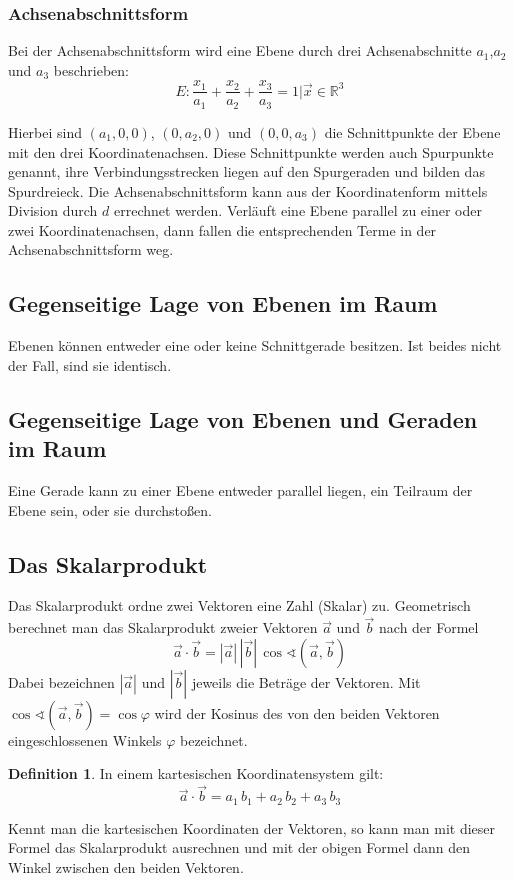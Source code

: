 \documentclass[a4paper,10pt,DIV9, BCOR12mm, oneside,openright,openbib]{scrreprt}
\theoremstyle{definition}
\newtheorem{mydef}{Definition}[section]
\theoremstyle{plain}
\begin{document}
\subsubsection{Achsenabschnittsform}    
Bei der Achsenabschnittsform wird eine Ebene durch drei Achsenabschnitte $a_{1}$,$ a_{2}$ und $a_{3}$ beschrieben:
    \[E: \frac {x_{1}}{a_{1}}+{\frac {x_{2}}{a_{2}}}+{\frac {x_{3}}{a_{3}}}=1 {\Big |} {\vec x}\in \mathbb{R} ^{3}\]
    

    
Hierbei sind $(a_{1},0,0)$, $(0,a_{2},0)$ und $(0,0,a_{3})$ die Schnittpunkte der Ebene mit den drei Koordinatenachsen. Diese Schnittpunkte werden auch Spurpunkte genannt, ihre Verbindungsstrecken liegen auf den Spurgeraden und bilden das Spurdreieck. Die Achsenabschnittsform kann aus der Koordinatenform mittels Division durch $d$ errechnet werden. Verläuft eine Ebene parallel zu einer oder zwei Koordinatenachsen, dann fallen die entsprechenden Terme in der Achsenabschnittsform weg.
    
    
\subsection{Gegenseitige Lage von Ebenen im Raum}    
Ebenen können entweder eine oder keine Schnittgerade besitzen. Ist beides nicht der Fall, sind sie identisch. 

\subsection{Gegenseitige Lage von Ebenen und Geraden im Raum}    
Eine Gerade kann zu einer Ebene entweder parallel liegen, ein Teilraum der Ebene sein, oder sie durchstoßen.

\subsection{Das Skalarprodukt}
Das Skalarprodukt ordne zwei Vektoren eine Zahl (Skalar) zu. Geometrisch berechnet man das Skalarprodukt zweier Vektoren ${\vec a}$ und ${\vec b}$ nach der Formel
    \[{\vec a}\cdot {\vec b}=|{\vec a}|\,|{\vec b}|\,\cos \sphericalangle ({\vec a},{\vec b})\]
Dabei bezeichnen $|{\vec a}|$ und $|{\vec b}|$ jeweils die Beträge der Vektoren. Mit$ \cos \sphericalangle ({\vec a},{\vec b})=\cos \varphi$ wird der Kosinus des von den beiden Vektoren eingeschlossenen Winkels $\varphi$ bezeichnet.
\begin{mydef}
In einem kartesischen Koordinatensystem gilt:
   \[ {\vec a}\cdot {\vec b}=a_{1}\,b_{1}+a_{2}\,b_{2}+a_{3}\,b_{3}\]
\end{mydef}
Kennt man die kartesischen Koordinaten der Vektoren, so kann man mit dieser Formel das Skalarprodukt ausrechnen und mit der obigen Formel dann den Winkel zwischen den beiden Vektoren.
\end{document}
